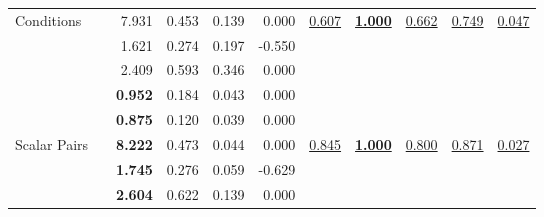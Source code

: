 \begin{tabular}{llrrrrrrrrr}
    Conditions & \DSTAR{} & 7.931 & 0.453 & 0.139 & 0.000 & \underline{0.607} & \textbf{\color{deepblue}\underline{1.000}} & \underline{0.662} & \underline{0.749} & \underline{0.047}\\
     & \NAISHT{} & 1.621 & 0.274 & 0.197 & -0.550 &  &  &  &  & \\
     & \GPOT{} & 2.409 & 0.593 & 0.346 & 0.000 &  &  &  &  & \\[.2em]
\rowcolor{row}
     & \TARANTULA{}\rowstrut{} & \textbf{\color{deepblue}0.952} & 0.184 & 0.043 & 0.000 &  &  &  &  & \\
\rowcolor{row}
     & \OCHIAI{} & \textbf{\color{deepblue}0.875} & 0.120 & 0.039 & 0.000 &  &  &  &  & \\
\rowcolor{row}
    Scalar Pairs & \DSTAR{} & \textbf{\color{deepblue}8.222} & 0.473 & 0.044 & 0.000 & \underline{0.845} & \textbf{\color{deepblue}\underline{1.000}} & \underline{0.800} & \underline{0.871} & \underline{0.027}\\
\rowcolor{row}
     & \NAISHT{} & \textbf{\color{deepblue}1.745} & 0.276 & 0.059 & -0.629 &  &  &  &  & \\
\rowcolor{row}
     & \GPOT{} & \textbf{\color{deepblue}2.604} & 0.622 & 0.139 & 0.000 &  &  &  &  & \\[.2em]
\bottomrule
\end{tabular}
